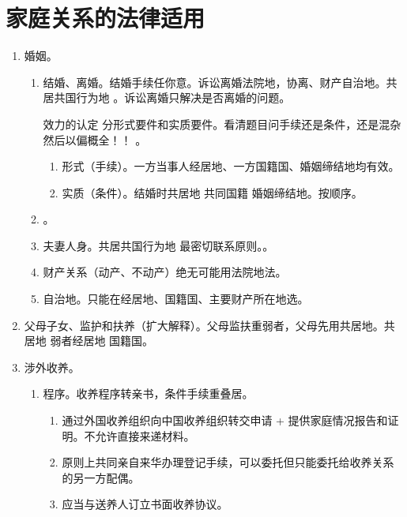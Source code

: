 \section{家庭关系的法律适用}
\begin{enumerate}
  \item 婚姻。
        \begin{enumerate}
          \item 结婚、离婚。结婚手续任你意。诉讼离婚法院地，协离、财产自治地。共居共国行为地 。诉讼离婚只解决是否离婚的问题。
                \begin{kk}{效力的认定}
                  分形式要件和实质要件。看清题目问手续还是条件，还是混杂然后以偏概全！！
                  。
                  \begin{enumerate}
                    \item 形式（手续）。一方当事人经居地、一方国籍国、婚姻缔结地均有效。
                    \item 实质（条件）。结婚时共居地 \yjt 共同国籍 \yjt 婚姻缔结地。按顺序。
                  \end{enumerate}
                \end{kk}
          \item {}。
          \item 夫妻人身。共居共国行为地 \yjt 最密切联系原则。。
          \item 财产关系（动产、不动产）绝无可能用法院地法。
          \item 自治地。只能在经居地、国籍国、主要财产所在地选。
        \end{enumerate}
  \item 父母子女、监护和扶养（扩大解释）。父母监扶重弱者，父母先用共居地。共居地 \yjt 弱者经居地 \hz 国籍国。
  \item 涉外收养。
        \begin{enumerate}
          \item 程序。收养程序转亲书，条件手续重叠居。
                \begin{enumerate}
                  \item 通过外国收养组织向中国收养组织转交申请 + 提供家庭情况报告和证明。不允许直接来递材料。
                  \item 原则上共同亲自来华办理登记手续，可以委托但只能委托给收养关系的另一方配偶。
                  \item 应当与送养人订立书面收养协议。

\end{enumerate}
\end{enumerate}
\end{enumerate}
